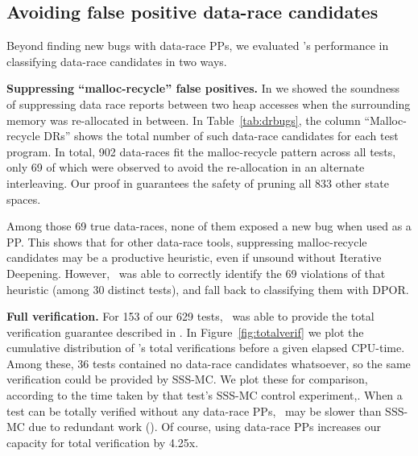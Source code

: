 %


\subsection{Avoiding false positive data-race candidates}
\label{sec:eval-falsepos}

Beyond finding new bugs with data-race PPs, we evaluated \quicksand's performance in classifying data-race candidates in two ways.

{\bf Suppressing ``malloc-recycle'' false positives.}
In \sect{\ref{sec:recycle}} we showed the soundness of suppressing data race reports between two heap accesses when the surrounding memory was re-allocated in between.
In Table~\ref{tab:drbugs}, the column ``Malloc-recycle DRs'' shows the total number of such data-race candidates for each test program.
In total, 902 data-races fit the malloc-recycle pattern across all tests,
only 69 of which were observed to avoid the re-allocation in an alternate interleaving.
Our proof in \sect{\ref{sec:recycle}} guarantees the safety of pruning all 833 other state spaces.

Among those 69 true data-races, %
none of them exposed a new bug when used as a PP.
This shows that for other data-race tools,
suppressing malloc-recycle candidates may be a productive heuristic,
even if unsound without Iterative Deepening.
However, \quicksand~was able to correctly identify the 69 violations of that heuristic (among 30 distinct tests),
and fall back to classifying them with DPOR.

{\bf Full verification.}
For 153 of our 629 tests, \quicksand~was able to provide the total verification guarantee described in \sect{\ref{sec:totalverif}}.
In Figure~\ref{fig:totalverif} we plot the cumulative distribution of \quicksand's total verifications before a given elapsed CPU-time.
Among these, 36 tests contained no data-race candidates whatsoever,
so the same verification could be provided by SSS-MC.
We plot these for comparison,
according to the time taken by that test's SSS-MC control experiment,.
When a test can be totally verified without any data-race PPs,
\quicksand~may be slower than SSS-MC due to redundant work (\sect{\ref{sec:future}}).
Of course, using data-race PPs increases our capacity for total verification by 4.25x.

